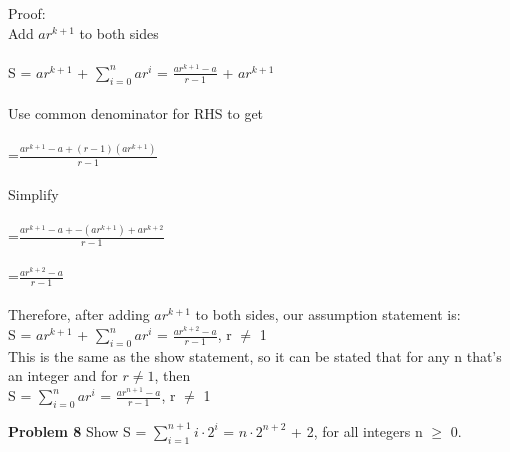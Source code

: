\documentclass[12pt]{article}
\begin{document}
Proof: \\
	Add $ar^{k + 1}$ to both sides \\
	\\
	 S = $ar^{k + 1}$ + $\sum\limits_{i = 0}^n ar^{i}$ = $\frac{ar^{k+1} - a}{r - 1}$ + $ar^{k + 1}$\\
	 \\
	 Use common denominator for RHS to get\\
	 \\
	 =$\frac{ar^{k+1} - a + (r-1)(ar^{k + 1})}{r - 1}$\\
	 \\
	 Simplify \\
	 \\
	 =$\frac{ar^{k+1} - a + -(ar^{k + 1}) + ar^{k + 2}}{r - 1}$ \\
	 \\
	 =$\frac{ar^{k+2} - a}{r - 1}$ \\
	 \\
	 Therefore, after adding $ar^{k + 1}$ to both sides, our assumption statement is: \\
	 S = $ar^{k + 1}$ + $\sum\limits_{i = 0}^n ar^{i}$ = $\frac{ar^{k+2} - a}{r - 1}$, r $\neq$ 1 \\
	 This is the same as the show statement, so it can be stated that for any n that's an integer
	 and for $r\neq1$, then \\
	 S = $\sum\limits_{i = 0}^n ar^{i}$ = $\frac{ar^{n+1} - a}{r - 1}$, r $\neq$ 1 \\




\par

\par
\bigskip
{\bf Problem
8
}
Show S = $\sum\limits_{i=1}^{n+1} i\cdot 2^{i}$ = $n\cdot 2^{n + 2}$ + 2, for all integers n $\geq$ 0.
\end{document}
